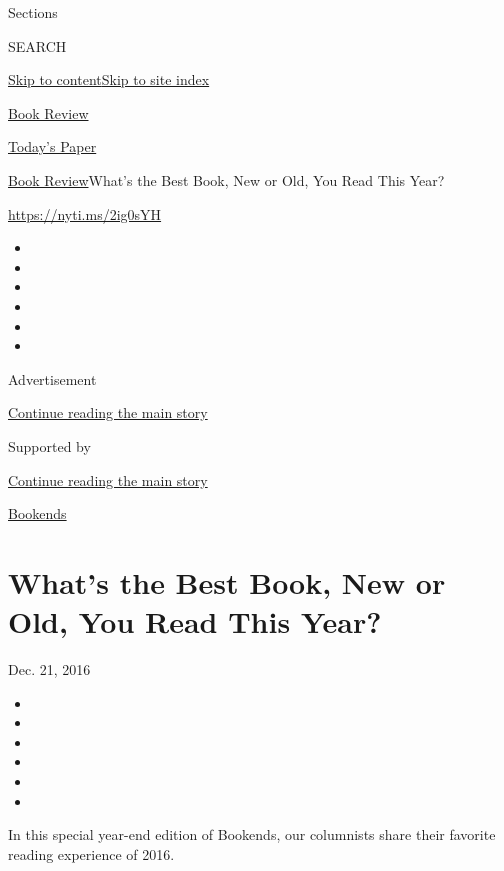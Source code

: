 Sections

SEARCH

\protect\hyperlink{site-content}{Skip to
content}\protect\hyperlink{site-index}{Skip to site index}

\href{https://www.nytimes3xbfgragh.onion/section/books/review}{Book
Review}

\href{https://myaccount.nytimes3xbfgragh.onion/auth/login?response_type=cookie\&client_id=vi}{}

\href{https://www.nytimes3xbfgragh.onion/section/todayspaper}{Today's
Paper}

\href{/section/books/review}{Book Review}\textbar{}What's the Best Book,
New or Old, You Read This Year?

\url{https://nyti.ms/2ig0sYH}

\begin{itemize}
\item
\item
\item
\item
\item
\item
\end{itemize}

Advertisement

\protect\hyperlink{after-top}{Continue reading the main story}

Supported by

\protect\hyperlink{after-sponsor}{Continue reading the main story}

\href{/column/bookends}{Bookends}

\hypertarget{whats-the-best-book-new-or-old-you-read-this-year}{%
\section{What's the Best Book, New or Old, You Read This
Year?}\label{whats-the-best-book-new-or-old-you-read-this-year}}

Dec. 21, 2016

\begin{itemize}
\item
\item
\item
\item
\item
\item
\end{itemize}

In this special year-end edition of Bookends, our columnists share their
favorite reading experience of 2016.

